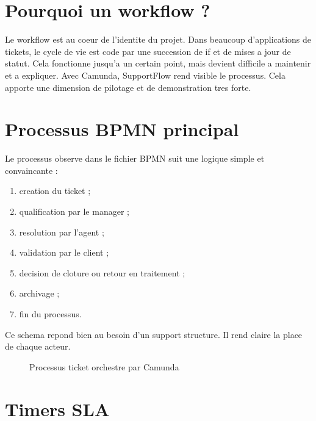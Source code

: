 \section{Pourquoi un workflow ?}

Le workflow est au coeur de l'identite du projet. Dans beaucoup d'applications de tickets, le cycle de vie est code par une succession de if et de mises a jour de statut. Cela fonctionne jusqu'a un certain point, mais devient difficile a maintenir et a expliquer. Avec Camunda, SupportFlow rend visible le processus. Cela apporte une dimension de pilotage et de demonstration tres forte.

\section{Processus BPMN principal}

Le processus observe dans le fichier BPMN suit une logique simple et convaincante :

\begin{enumerate}[leftmargin=1.2cm]
  \item creation du ticket ;
  \item qualification par le manager ;
  \item resolution par l'agent ;
  \item validation par le client ;
  \item decision de cloture ou retour en traitement ;
  \item archivage ;
  \item fin du processus.
\end{enumerate}

Ce schema repond bien au besoin d'un support structure. Il rend claire la place de chaque acteur.

\begin{figure}[htbp]
  \centering
  \caption{Processus ticket orchestre par Camunda}
\end{figure}

\section{Timers SLA}


